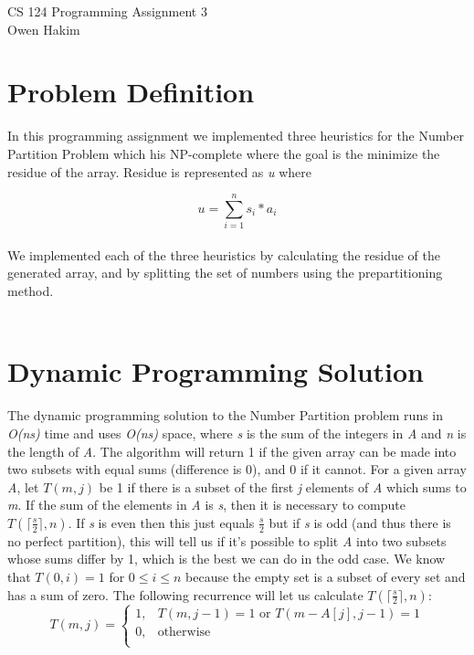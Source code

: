 \documentclass[11pt]{article}
\newcommand\ceil[1]{\lceil#1\rceil}
\begin{document}
CS 124 Programming Assignment 3 \\
\indent Owen Hakim
\\
\section{\textbf{Problem Definition}}
In this programming assignment we implemented three heuristics for the Number Partition Problem which his NP-complete where the goal is the minimize the residue of the array. Residue is represented as \textit{u} where

\[ u = \sum_{i = 1}^{n} s_{i} * a_{i} \] \\

We implemented each of the three heuristics by calculating the residue of the generated array, and by splitting the set of numbers using the prepartitioning method. \\\\

\section{\textbf{Dynamic Programming Solution}}
The dynamic programming solution to the Number Partition problem runs in \textit{O(ns)} time and uses \textit{O(ns)} space, where \textit{s} is the sum of the integers in \textit{A} and \textit{n} is the length of \textit{A}. The algorithm will return 1 if the given array can be made into two subsets with equal sums (difference is 0), and 0 if it cannot. For a given array \textit{A}, let $T(m,j)$ be 1 if there is a subset of the first \textit{j} elements of \textit{A} which sums to \textit{m}. If the sum of the elements in \textit{A} is \textit{s}, then it is necessary to compute $T(\ceil{\frac{s}{2}}, n)$. If \textit{s} is even then this just equals $\frac{s}{2}$ but if \textit{s} is odd (and thus there is no perfect partition), this will tell us if it’s possible to split \textit{A} into two subsets whose sums differ by 1, which is the best we can do in the odd case. We know that $T(0, i) = 1$ for $0 \leq i \leq n$ because the empty set is a subset of every set and has a sum of zero. The following recurrence will let us calculate $T(\ceil{\frac{s}{2}}, n)$: \\

\begin{equation}
	T(m, j) = \begin{cases}
		1, & \text{$T(m, j - 1) = 1$ or $T(m - A[j], j - 1) = 1$} \\
		0, & \text{otherwise} \\
	\end{cases}
\end{equation}
\end{document}
